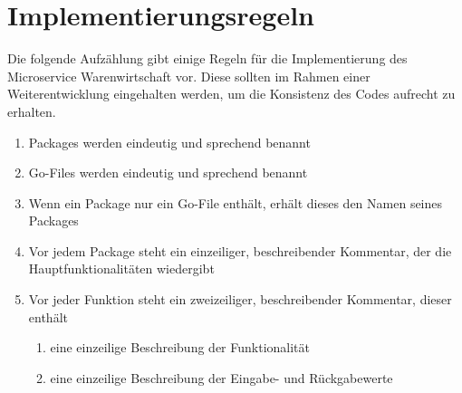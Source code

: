 \section{Implementierungsregeln}
\label{sec: Implementierungsregeln}
Die folgende Aufzählung gibt einige Regeln für die Implementierung des Microservice Warenwirtschaft vor. Diese sollten im Rahmen einer Weiterentwicklung eingehalten werden, um die Konsistenz des Codes aufrecht zu erhalten. 

\begin{enumerate}
	\item Packages werden eindeutig und sprechend benannt
	\item Go-Files werden eindeutig und sprechend benannt
	\item Wenn ein Package nur ein Go-File enthält, erhält dieses den Namen seines Packages
	\item Vor jedem Package steht ein einzeiliger, beschreibender Kommentar, der die Hauptfunktionalitäten wiedergibt
	\item Vor jeder Funktion steht ein zweizeiliger, beschreibender Kommentar, dieser enthält
	\begin{enumerate}
		\item eine einzeilige Beschreibung der Funktionalität
		\item eine einzeilige Beschreibung der Eingabe- und Rückgabewerte
	\end{enumerate}
\end{enumerate}

